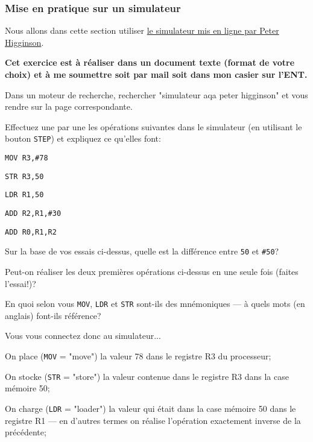 \documentclass[12pt]{article}
\begin{document}
	 \subsubsection*{Mise en pratique sur un simulateur}
	 
	 Nous allons dans cette section utiliser \href{https://www.peterhigginson.co.uk/AQA}{le simulateur mis en ligne par Peter Higginson}.
	 
	 \begin{MonExo}
	 	\textbf{Cet exercice est à réaliser dans un document texte (format de votre choix) et à me soumettre soit par mail soit dans mon casier sur l'ENT.}
	 	\begin{alphenum}
	 		\item Dans un moteur de recherche, rechercher "simulateur aqa peter higginson" et vous rendre sur la page correspondante.
	 		\item Effectuez une par une les opérations suivantes dans le simulateur (en utilisant le bouton \texttt{STEP}) et expliquez ce qu'elles font:
	 		\begin{alphenum}
	 			\item \texttt{MOV R3,\#78}
	 			\item \texttt{STR R3,50}
	 			\item \texttt{LDR R1,50}
	 			\item \texttt{ADD R2,R1,\#30}
	 			\item \texttt{ADD R0,R1,R2}
	 		\end{alphenum}
	 		\item Sur la base de vos essais ci-dessus, quelle est la différence entre \texttt{50} et \texttt{\#50}?
	 		\item Peut-on réaliser les deux premières opérations ci-dessus en une seule fois (faites l'essai!)?
	 		\item En quoi selon vous \texttt{MOV}, \texttt{LDR} et \texttt{STR} sont-ils des mnémoniques --- à quels mots (en anglais) font-ils référence?
	 	\end{alphenum}
	 \end{MonExo}
	 
	 \begin{MaReponse}
	 	\begin{alphenum}
	 		\item Vous vous connectez donc au simulateur...
	 		\item 
	 		\begin{alphenum}
	 			\item On place (\texttt{MOV} = "move") la valeur 78 dans le registre R3 du processeur;
	 			\item On stocke (\texttt{STR} = "store") la valeur contenue dans le registre R3 dans la case mémoire 50;
	 			\item On charge (\texttt{LDR} = "loader") la valeur qui était dans la case mémoire 50 dans le registre R1 --- en d'autres termes on réalise l'opération exactement inverse de la précédente;
	 		\end{alphenum}
	 	\end{alphenum}
	 \end{MaReponse}
	 
\end{document}
